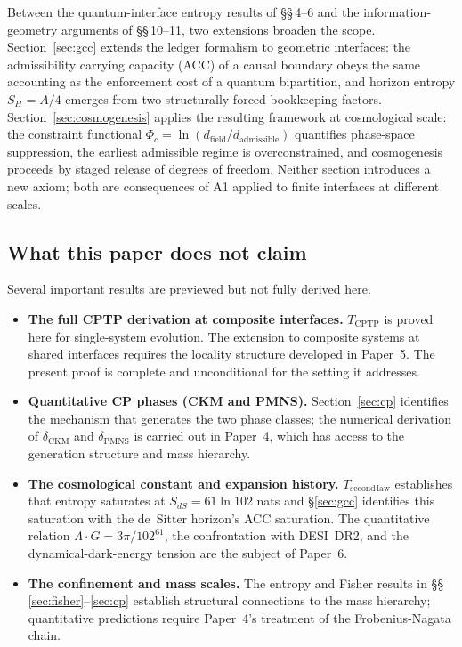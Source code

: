 \documentclass[11pt]{article}
\newenvironment{varlist}{\begin{itemize}[nosep,leftmargin=2em]}{\end{itemize}}
\begin{document}
Between the quantum-interface entropy results of \S\S\,4--6 and the
information-geometry arguments of \S\S\,10--11, two extensions broaden the
scope.  Section~\ref{sec:gcc} extends the ledger formalism to geometric
interfaces: the admissibility carrying capacity (ACC) of a causal boundary
obeys the same accounting as the enforcement cost of a quantum bipartition,
and horizon entropy $S_{H}=A/4$ emerges from two structurally forced
bookkeeping factors.  Section~\ref{sec:cosmogenesis} applies the resulting
framework at cosmological scale: the constraint functional
$\Phi_c = \ln(d_{\mathrm{field}}/d_{\mathrm{admissible}})$ quantifies
phase-space suppression, the earliest admissible regime is overconstrained,
and cosmogenesis proceeds by staged release of degrees of freedom.  Neither
section introduces a new axiom; both are consequences of A1 applied to
finite interfaces at different scales.

\subsection{What this paper does not claim}

Several important results are previewed but not fully derived here.

\begin{varlist}
  \item \textbf{The full CPTP derivation at composite interfaces.}
    $T_{\mathrm{CPTP}}$ is proved here for single-system evolution.  The
    extension to composite systems at shared interfaces requires the locality
    structure developed in Paper~5.  The present proof is complete and
    unconditional for the setting it addresses.

  \item \textbf{Quantitative CP phases (CKM and PMNS).}  Section~\ref{sec:cp}
    identifies the mechanism that generates the two phase classes; the
    numerical derivation of $\delta_{\mathrm{CKM}}$ and $\delta_{\mathrm{PMNS}}$
    is carried out in Paper~4, which has access to the generation structure
    and mass hierarchy.

  \item \textbf{The cosmological constant and expansion history.}
    $T_{\mathrm{second\,law}}$ establishes that entropy saturates at
    $S_{dS} = 61\ln 102$ nats and \S\ref{sec:gcc} identifies this saturation
    with the de~Sitter horizon's ACC saturation.  The quantitative
    relation $\Lambda\cdot G = 3\pi/102^{61}$, the confrontation with
    DESI~DR2, and the dynamical-dark-energy tension are the subject of
    Paper~6.

  \item \textbf{The confinement and mass scales.}  The entropy and Fisher
    results in \S\S\,\ref{sec:fisher}--\ref{sec:cp} establish structural
    connections to the mass hierarchy; quantitative predictions require
    Paper~4's treatment of the Frobenius-Nagata chain.
\end{varlist}
\end{document}
